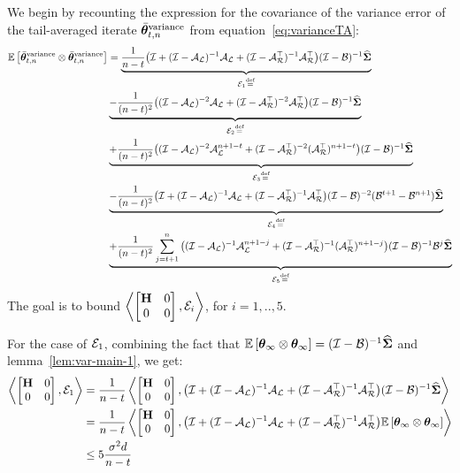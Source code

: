 We begin by recounting the expression for the covariance of the variance error of the tail-averaged iterate $\thetavb^{\textrm{variance}}$ from equation~\ref{eq:varianceTA}:
\begin{align*}
\E{\thetavb^{\text{variance}}\otimes\thetavb^{\text{variance}}}
&=\underbrace{\frac{1}{n-t}\big(\eyeT + (\eyeT-\AL)^{-1}\AL + (\eyeT-\AR\T)^{-1}\AR\T\big)(\eyeT-\BT)^{-1}\Sigh}_{\Y_1\eqdef}\nonumber\\&\underbrace{-\frac{1}{(n-t)^2}\big((\eyeT-\AL)^{-2}\AL+(\eyeT-\AR\T)^{-2}\AR\T\big)(\eyeT-\BT)^{-1}\Sigh}_{\Y_2\eqdef}\nonumber\\&\underbrace{+\frac{1}{(n-t)^2}\big((\eyeT-\AL)^{-2}\AL^{n+1-t}+(\eyeT-\AR\T)^{-2}(\AR\T)^{n+1-t}\big)(\eyeT-\BT)^{-1}\Sigh}_{\Y_3\eqdef}\nonumber\\&\underbrace{-\frac{1}{(n-t)^2}\big(\eyeT + (\eyeT-\AL)^{-1}\AL + (\eyeT-\AR\T)^{-1}\AR\T\big)(\eyeT-\BT)^{-2}(\BT^{t+1}-\BT^{n+1})\Sigh}_{\Y_4\eqdef}\nonumber\\&\underbrace{+\frac{1}{(n-t)^2}\sum_{j=t+1}^n\big((\eyeT-\AL)^{-1}\AL^{n+1-j}+(\eyeT-\AR\T)^{-1}(\AR\T)^{n+1-j}\big)(\eyeT-\BT)^{-1}\BT^j\Sigh}_{\Y_5\eqdef}
\end{align*}
The goal is to bound $\iprod{\begin{bmatrix}\H&0\\0&0\end{bmatrix}}{\Y_i}$, for $i=1,..,5$.

For the case of $\Y_1$, combining the fact that $\E{\thetav_{\infty}\otimes\thetav_{\infty}}=(\eyeT-\BT)^{-1}\Sigh$ and lemma~\ref{lem:var-main-1}, we get:
\begin{align}
\label{eq:e1}
\iprod{\begin{bmatrix}\H&0\\0&0\end{bmatrix}}{\Y_1}&=\frac{1}{n-t}\iprod{\begin{bmatrix}\H&0\\0&0\end{bmatrix}}{\big(\eyeT + (\eyeT-\AL)^{-1}\AL + (\eyeT-\AR\T)^{-1}\AR\T\big)(\eyeT-\BT)^{-1}\Sigh}\nonumber\\
&=\frac{1}{n-t}\iprod{\begin{bmatrix}\H&0\\0&0\end{bmatrix}}{\big(\eyeT + (\eyeT-\AL)^{-1}\AL + (\eyeT-\AR\T)^{-1}\AR\T\big)\E{\thetav_\infty\otimes\thetav_\infty}}\nonumber\\
&\leq 5\frac{\sigma^2d}{n-t}
\end{align}

